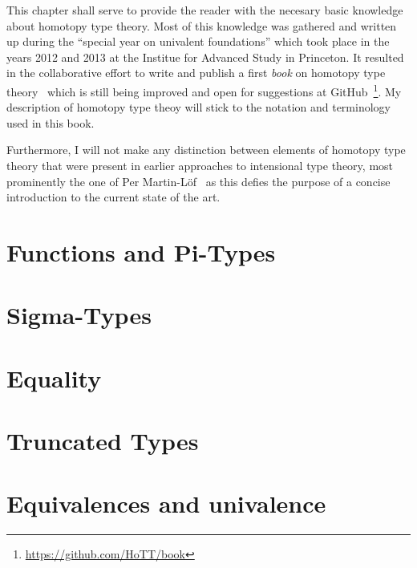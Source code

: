 This chapter shall serve to provide the reader with the necesary basic knowledge
about homotopy type theory.
Most of this knowledge was gathered and written up during the ``special year 
on univalent foundations'' which took place in the years 2012 and 2013
at the Institue for Advanced Study in Princeton.
It resulted in the collaborative effort to write and publish a first \emph{book}
on homotopy type theory~\cite{hottbook} which is still being improved and open
for suggestions at GitHub~\footnote{\url{https://github.com/HoTT/book}}.
My description of homotopy type theoy will stick to the notation and terminology
used in this book.

Furthermore, I will not make any distinction between elements of homotopy type
theory that were present in earlier approaches to intensional type theory,
most prominently the one of Per Martin-Löf~\cite{martin-lof1} as this
defies the purpose of a concise introduction to the current state of the art.


\section{Functions and Pi-Types}

\section{Sigma-Types}

\section{Equality}

\section{Truncated Types}

\section{Equivalences and univalence}
